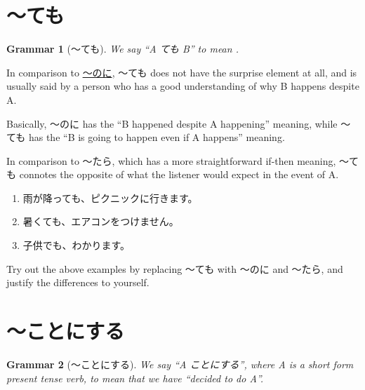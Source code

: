\documentclass[notoc,notitlepage]{tufte-book}
\newtheorem{grammar}{\faBook Grammar}
\begin{document}

\section{〜ても}%
\label{sec:temo}

\begin{grammar}[〜ても]\label{grammar:_temo}
  We say ``A ても B'' to mean .
\end{grammar}

\begin{note}[Comparison to 〜のに]
  In comparison to \hyperref[grammar:_noni]{〜のに},
  〜ても does not have the surprise element at all,
  and is usually said by a person who has a good understanding
  of why B happens despite A.

  Basically, 〜のに has the ``B happened despite A happening'' meaning,
  while 〜ても has the ``B is going to happen even if A happens'' meaning.
\end{note}

\begin{note}[Comparison to 〜たら]
  In comparison to 〜たら,
  which has a more straightforward if-then meaning,
  〜ても connotes the opposite of what the listener would expect
  in the event of A.
\end{note}

\begin{eg}
  \begin{enumerate}
    \item 雨が降っても、ピクニックに行きます。
    \item 暑くても、エアコンをつけません。
    \item 子供でも、わかります。
  \end{enumerate}
\end{eg}

\begin{ex}
  Try out the above examples by replacing 〜ても with
  〜のに and 〜たら, and justify the differences to yourself.
\end{ex}


\section{〜ことにする}%
\label{sec:kotonisuru}

\begin{grammar}[〜ことにする]\label{grammar:_kotonisuru}
  We say ``A ことにする'', where A is a short form present tense verb,
  to mean that we have ``decided to do A''.
\end{grammar}
\end{document}
